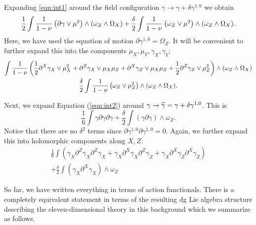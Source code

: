 \documentclass[11pt]{amsart}
\begin{document}
Expanding \eqref{eqn:int1} around the field configuration $\gamma \to \gamma + \delta \gamma^{1,0}$ we obtain
\[
  \frac12 \int \frac{1}{1-\nu} \left(\del \gamma \vee \mu^2 \right) \wedge (\omega_Z \wedge \Omega_X) + \frac{\delta}{2} \int \frac{1}{1-\nu} \left(\omega_Z \vee \mu^2 \right) \wedge (\omega_Z \wedge \Omega_X) .
\]
Here, we have used the equation of motion $\partial \gamma^{1,0} = \Omega_Z$.
It will be convenient to further expand this into the components $\mu_X, \mu_Y, \gamma_X, \gamma_Y$:
\begin{multline}
 \int \frac{1}{1-\nu} \left(\frac12 \del^X \gamma_X \vee \mu_X^2  + \del^Z \gamma_X \vee \mu_X \mu_Z + \del^X \gamma_Z \vee \mu_X\mu_Z + \frac12 \del^Z \gamma_Z \vee \mu_Z^2 \right) \wedge (\omega_Z \wedge \Omega_X) 
 \\
  \frac{\delta}{2} \int \frac{1}{1-\nu} \left(\omega_Z \vee \mu_Z^2 \right) \wedge (\omega_Z \wedge \Omega_X) .
  \label{eqn:delta1}
\end{multline}

Next, we expand Equation (\ref{eqn:int2}) around $\gamma \to \Tilde{\gamma} = \gamma + \delta \gamma^{1,0}$.
This is
\[
  \frac16 \int \gamma \partial \gamma \partial \gamma + \frac{\delta}{2} \int \left(\gamma \partial \gamma\right) \wedge \omega_Z .
\]
Notice that there are no $\delta^2$ terms since $\partial \gamma^{1,0} \partial \gamma^{1,0} = 0$.
Again, we further expand this into holomorphic components along $X,Z$:
\begin{multline}
\frac16 \int \left(\gamma_X \partial^Z \gamma_X \partial^Z \gamma_X +\gamma_X \partial^X \gamma_X \partial^Z \gamma_Z +  \gamma_X \partial^X \gamma_Z \partial^X \gamma_Z \right)
\\
+ \frac{\delta}{2} \int \left(\gamma_X \partial^X \gamma_X \right) \wedge \omega_Z 
\label{eqn:delta2}
\end{multline}

So far, we have written everything in terms of action functionals.
There is a completely equivalent statement in terms of the resulting dg Lie algebra structure describing the eleven-dimensional theory in this background which we summarize as follows.
\end{document}
